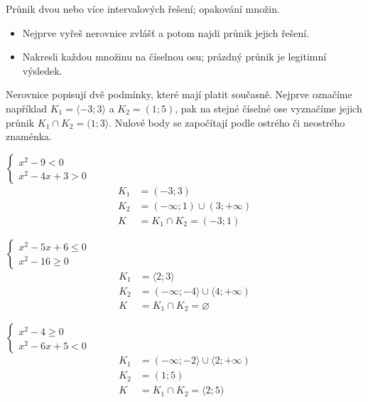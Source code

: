 \documentclass[11pt,a4paper]{article}
\begin{document}
Průnik dvou nebo více intervalových řešení; opakování množin.
\begin{itemize}
\item Nejprve vyřeš nerovnice zvlášť a potom najdi průnik jejich řešení.
\item Nakresli každou množinu na číselnou osu; prázdný průnik je legitimní výsledek.
\end{itemize}
Nerovnice popisují dvě podmínky, které mají platit současně. Nejprve označíme například
$K_1=\langle-3;3\rangle$ a $K_2=(1;5)$, pak na stejné číselné ose vyznačíme jejich průnik
$K_1\cap K_2=(1;3\rangle$. Nulové body se započítají podle ostrého či neostrého znaménka.
\begin{prikladReseniBox}[title={Příklad 1}]
$\begin{cases}x^{2} - 9<0\\x^{2} - 4x + 3>0\end{cases}$
\tcblower
\[
\begin{aligned}
K_1&=(-3;3)\\[2pt]
K_2&=(-\infty;1)\cup(3;+\infty)\\[2pt]
K&=K_1\cap K_2=(-3;1)
\end{aligned}
\]
\end{prikladReseniBox}
\begin{prikladReseniBox}[title={Příklad 2}]
$\begin{cases}x^{2} - 5x + 6\le0\\x^{2} - 16\ge0\end{cases}$
\tcblower
\[
\begin{aligned}
K_1&=\langle2;3\rangle\\[2pt]
K_2&=(-\infty;-4\rangle\cup\langle4;+\infty)\\[2pt]
K&=K_1\cap K_2=\varnothing
\end{aligned}
\]
\end{prikladReseniBox}
\begin{zadaniReseniBox}[title={Samostatná práce 1}]
$\begin{cases}x^{2} - 4\ge0\\x^{2} - 6x + 5<0\end{cases}$
\tcblower
\[
\begin{aligned}
K_1&=(-\infty;-2\rangle\cup\langle2;+\infty)\\[2pt]
K_2&=(1;5)\\[2pt]
K&=K_1\cap K_2=\langle2;5)
\end{aligned}
\]
\end{zadaniReseniBox}
\end{document}
